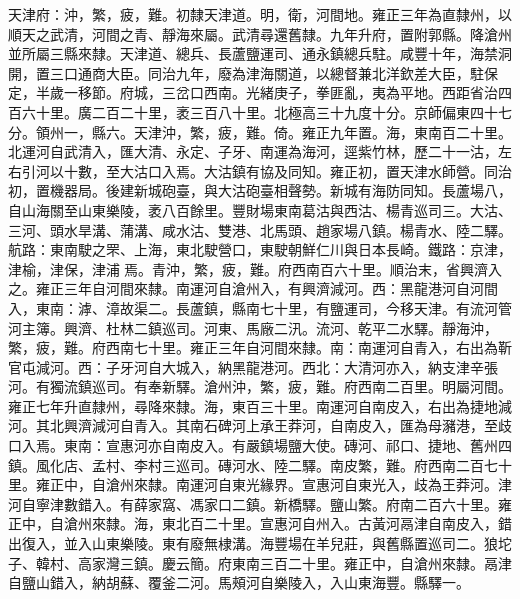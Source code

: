 \begin{pinyinscope}
天津府：沖，繁，疲，難。初隸天津道。明，衛，河間地。雍正三年為直隸州，以順天之武清，河間之青、靜海來屬。武清尋還舊隸。九年升府，置附郭縣。降滄州並所屬三縣來隸。天津道、總兵、長蘆鹽運司、通永鎮總兵駐。咸豐十年，海禁洞開，置三口通商大臣。同治九年，廢為津海關道，以總督兼北洋欽差大臣，駐保定，半歲一移節。府城，三岔口西南。光緒庚子，拳匪亂，夷為平地。西距省治四百六十里。廣二百二十里，袤三百八十里。北極高三十九度十分。京師偏東四十七分。領州一，縣六。天津沖，繁，疲，難。倚。雍正九年置。海，東南百二十里。北運河自武清入，匯大清、永定、子牙、南運為海河，逕紫竹林，歷二十一沽，左右引河以十數，至大沽口入焉。大沽鎮有協及同知。雍正初，置天津水師營。同治初，置機器局。後建新城砲臺，與大沽砲臺相聲勢。新城有海防同知。長蘆場八，自山海關至山東樂陵，袤八百餘里。豐財場東南葛沽與西沽、楊青巡司三。大沽、三河、頭水旱溝、蒲溝、咸水沽、雙港、北馬頭、趙家場八鎮。楊青水、陸二驛。航路：東南駛之罘、上海，東北駛營口，東駛朝鮮仁川與日本長崎。鐵路：京津，津榆，津保，津浦焉。青沖，繁，疲，難。府西南百六十里。順治末，省興濟入之。雍正三年自河間來隸。南運河自滄州入，有興濟減河。西：黑龍港河自河間入，東南：滹、漳故渠二。長蘆鎮，縣南七十里，有鹽運司，今移天津。有流河管河主簿。興濟、杜林二鎮巡司。河東、馬廠二汛。流河、乾平二水驛。靜海沖，繁，疲，難。府西南七十里。雍正三年自河間來隸。南：南運河自青入，右出為靳官屯減河。西：子牙河自大城入，納黑龍港河。西北：大清河亦入，納支津辛張河。有獨流鎮巡司。有奉新驛。滄州沖，繁，疲，難。府西南二百里。明屬河間。雍正七年升直隸州，尋降來隸。海，東百三十里。南運河自南皮入，右出為捷地減河。其北興濟減河自青入。其南石碑河上承王莽河，自南皮入，匯為母瀦港，至歧口入焉。東南：宣惠河亦自南皮入。有嚴鎮場鹽大使。磚河、祁口、捷地、舊州四鎮。風化店、孟村、李村三巡司。磚河水、陸二驛。南皮繁，難。府西南二百七十里。雍正中，自滄州來隸。南運河自東光緣界。宣惠河自東光入，歧為王莽河。津河自寧津數錯入。有薛家窩、馮家口二鎮。新橋驛。鹽山繁。府南二百六十里。雍正中，自滄州來隸。海，東北百二十里。宣惠河自州入。古黃河鬲津自南皮入，錯出復入，並入山東樂陵。東有廢無棣溝。海豐場在羊兒莊，與舊縣置巡司二。狼坨子、韓村、高家灣三鎮。慶云簡。府東南三百二十里。雍正中，自滄州來隸。鬲津自鹽山錯入，納胡蘇、覆釜二河。馬頰河自樂陵入，入山東海豐。縣驛一。


\end{pinyinscope}
